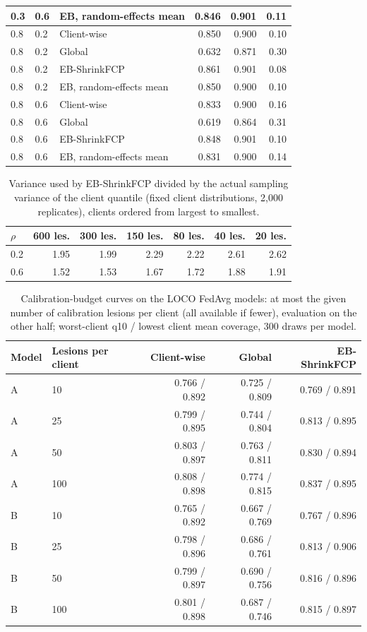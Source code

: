 \documentclass[10pt]{article}
\begin{document}
\begin{table}[!htbp]
\begin{tabular}{@{}lllrrr@{}}
0.3 & 0.6 & EB, random-effects mean & 0.846 & 0.901 & 0.11 \\
\midrule
0.8 & 0.2 & Client-wise & 0.850 & 0.900 & 0.10 \\
0.8 & 0.2 & Global & 0.632 & 0.871 & 0.30 \\
0.8 & 0.2 & EB-ShrinkFCP & 0.861 & 0.901 & 0.08 \\
0.8 & 0.2 & EB, random-effects mean & 0.850 & 0.900 & 0.10 \\
\midrule
0.8 & 0.6 & Client-wise & 0.833 & 0.900 & 0.16 \\
0.8 & 0.6 & Global & 0.619 & 0.864 & 0.31 \\
0.8 & 0.6 & EB-ShrinkFCP & 0.848 & 0.901 & 0.10 \\
0.8 & 0.6 & EB, random-effects mean & 0.831 & 0.900 & 0.14 \\
\bottomrule
\end{tabular}
\end{table}
\begin{table}[!htbp]
\centering
\scriptsize
\caption{Variance used by EB-ShrinkFCP divided by the actual sampling variance of the client quantile (fixed client distributions, 2,000 replicates), clients ordered from largest to smallest.}
\label{tab:s16v}
\begin{tabular}{@{}lrrrrrr@{}}
\toprule
$\rho$ & 600 les. & 300 les. & 150 les. & 80 les. & 40 les. & 20 les. \\
\midrule
0.2 & 1.95 & 1.99 & 2.29 & 2.22 & 2.61 & 2.62 \\
0.6 & 1.52 & 1.53 & 1.67 & 1.72 & 1.88 & 1.91 \\
\bottomrule
\end{tabular}
\end{table}
\begin{table}[!htbp]
\centering
\scriptsize
\caption{Calibration-budget curves on the LOCO FedAvg models: at most the given number of calibration lesions per client (all available if fewer), evaluation on the other half; worst-client q10 / lowest client mean coverage, 300 draws per model.}
\label{tab:s16b}
\begin{tabular}{@{}llrrr@{}}
\toprule
Model & Lesions per client & Client-wise & Global & EB-ShrinkFCP \\
\midrule
A & 10 & 0.766 / 0.892 & 0.725 / 0.809 & 0.769 / 0.891 \\
A & 25 & 0.799 / 0.895 & 0.744 / 0.804 & 0.813 / 0.895 \\
A & 50 & 0.803 / 0.897 & 0.763 / 0.811 & 0.830 / 0.894 \\
A & 100 & 0.808 / 0.898 & 0.774 / 0.815 & 0.837 / 0.895 \\
\midrule
B & 10 & 0.765 / 0.892 & 0.667 / 0.769 & 0.767 / 0.896 \\
B & 25 & 0.798 / 0.896 & 0.686 / 0.761 & 0.813 / 0.906 \\
B & 50 & 0.799 / 0.897 & 0.690 / 0.756 & 0.816 / 0.896 \\
B & 100 & 0.801 / 0.898 & 0.687 / 0.746 & 0.815 / 0.897 \\
\bottomrule
\end{tabular}
\end{table}
\end{document}

